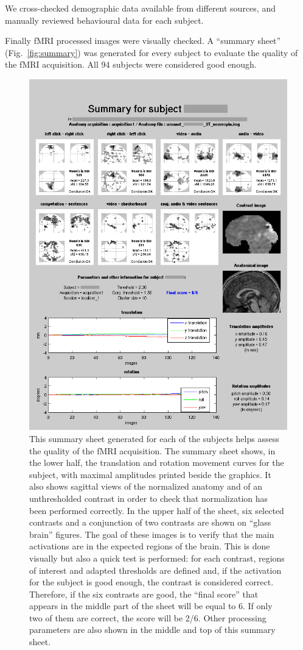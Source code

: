 \documentclass[review]{elsarticle}
\begin{document}
We cross-checked demographic data available from different sources, and manually reviewed behavioural data for each subject.

Finally fMRI processed images were visually checked. A ``summary sheet'' (Fig.~\ref{fig:summary}) was generated for every subject to evaluate the quality of the fMRI acquisition. All 94 subjects were considered good enough.

\begin{figure}[ht!]
    \centering
    \includegraphics[scale=0.4]{summary}
    \caption{This summary sheet generated for each of the subjects helps assess the quality of the fMRI acquisition. The summary sheet shows, in the lower half, the translation and rotation movement curves for the subject, with maximal amplitudes printed beside the graphics. It also shows sagittal views of the normalized anatomy and of an unthresholded contrast in order to check that normalization has been performed correctly. In the upper half of the sheet, six selected contrasts and a conjunction of two contrasts are shown on ``glass brain'' figures. The goal of these images is to verify that the main activations are in the expected regions of the brain. This is done visually but also a quick test is performed: for each contrast, regions of interest and adapted thresholds are defined and, if the activation for the subject is good enough, the contrast is considered correct. Therefore, if the six contrasts are good, the ``final score'' that appears in the middle part of the sheet will be equal to 6. If only two of them are correct, the score will be 2/6. Other processing parameters are also shown in the middle and top of this summary sheet.}

\end{figure}
\end{document}
